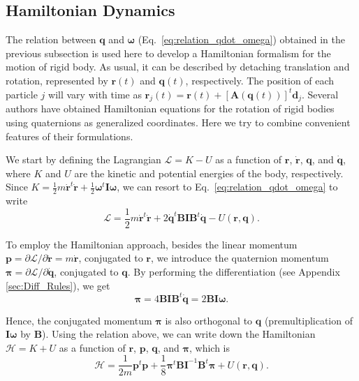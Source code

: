 \documentclass[aip,jcp,reprint,amsmath,amssymb,raggedbottom]{revtex4-1}
\newcommand{\mt}[1]{\boldsymbol{\mathbf{#1}}}           %
\newcommand{\vt}[1]{\boldsymbol{\mathbf{#1}}}           %
\newcommand{\tr}[1]{#1^t}                               %
\begin{document}
\subsection{Hamiltonian Dynamics}
\label{sec:hamiltonian}

The relation between $\vt q$ and $\vt \omega$ (Eq.~\ref{eq:relation_qdot_omega}) obtained in the previous subsection is used here to develop a Hamiltonian formalism for the motion of rigid body. As usual, it can be described by detaching translation and rotation, represented by ${\vt r}(t)$ and ${\vt q}(t)$, respectively. The position of each particle $j$ will vary with time as $\vt r_j(t) = \vt r(t) + \tr{[{\mt A}(\vt q(t))]}\vt d_j$. Several authors have obtained Hamiltonian equations for the rotation of rigid bodies using quaternions as generalized coordinates.\cite{Maciejewski1985, Dichmann1996, Miller2002, Ravishankar2004, Nielsen2012} Here we try to combine convenient features of their formulations.

We start by defining the Lagrangian $\mathcal{L} = K - U$ as a function of $\vt r$, $\dot{\vt r}$, $\vt q$, and $\dot{\vt q}$, where $K$ and $U$ are the kinetic and potential energies of the body, respectively. Since $K = \frac{1}{2} m \tr{\dot{\vt r}} \dot{\vt r} + \frac{1}{2} \tr{\vt \omega} \mt I \vt \omega$,\cite{Goldstein2002} we can resort to Eq.~\ref{eq:relation_qdot_omega} to write
\[
\mathcal{L} = \frac{1}{2} m \tr{\dot{\vt r}} \dot{\vt r} + 2 \tr{\dot{\vt q}} \mt B \mt I \tr{\mt B} \dot{\vt q} - U(\vt r, \vt q).
\]

To employ the Hamiltonian approach, besides the linear momentum $\vt p = \partial \mathcal{L}/\partial \dot{\vt r} = m \dot{\vt r}$, conjugated to $\vt r$, we introduce the quaternion momentum $\vt \pi = \partial \mathcal{L}/\partial \dot{\vt q}$, conjugated to $\vt q$.\citep{Goldstein2002} By performing the differentiation (see Appendix \ref{sec:Diff_Rules}), we get
\begin{equation}
\label{eq:conj_momentum}
\vt \pi = 4 \mt B \mt I \tr{\mt B} \dot{\vt q} = 2 \mt B \mt I \vt \omega.
\end{equation}

Hence, the conjugated momentum $\vt \pi$ is also orthogonal to $\vt q$ (premultiplication of $\mt I \vt \omega$ by $\mt B$). Using the relation above, we can write down the Hamiltonian $\mathcal{H} = K + U$ as a function of $\vt r$, $\vt p$, $\vt q$, and $\vt \pi$, which is
\begin{equation}
\label{eq:H_with_B}
\mathcal{H} = \frac{1}{2m} \tr{\vt p} \vt p + \frac{1}{8} \tr{\vt \pi} {\mt B} {\mt I}^{-1} \tr{\mt B} \vt \pi + U(\vt r, \vt q).
\end{equation}
\end{document}
